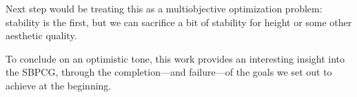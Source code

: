 \documentclass[sigconf]{acmart}
\begin{document}
Next step would be treating this as a multiobjective optimization problem:
stability is the first, but we can sacrifice a bit of stability for
height or some other aesthetic quality.


To conclude on an optimistic tone, this work provides an interesting insight 
into the SBPCG, through the completion---and failure---of the goals we
set out to achieve at the beginning.
%




\end{document}
